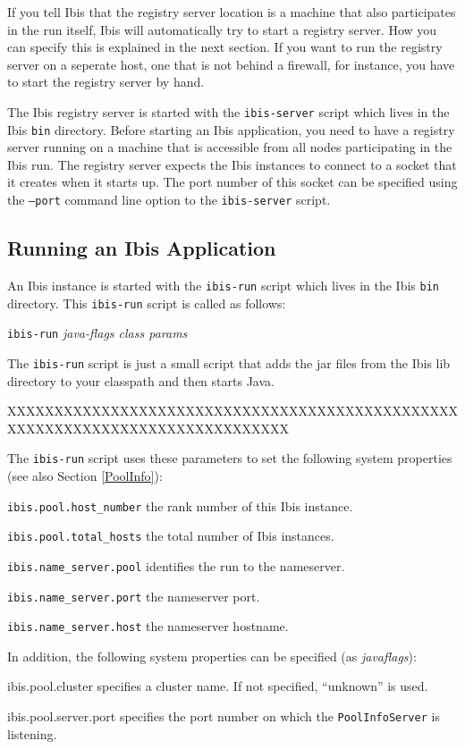 \documentclass[10pt]{article}
\newcommand{\mysubsection}[1]{\subsection{#1}\label{#1}}
\begin{document}
If you tell Ibis that the registry server location is a machine that also
participates in the run itself, Ibis will automatically try to start
a registry server. How you can specify this is explained in the next section.
If you want to run the registry server on a seperate host, one that is not
behind a firewall, for instance, you have to start the registry server by
hand.

The Ibis registry server is started with the \texttt{ibis-server}
script which lives in the Ibis \texttt{bin} directory.
Before starting an Ibis application,
you need to have a registry server running on a machine that is accessible
from all nodes participating in the Ibis run.
The registry server expects the Ibis instances to connect to a
socket that it creates when it starts up.
The port number of this socket can be specified using the
\texttt{--port} command line option to the \texttt{ibis-server} script.

\mysubsection{Running an Ibis Application}

An Ibis instance is started with the \texttt{ibis-run} script which
lives in the Ibis \texttt{bin} directory.  This \texttt{ibis-run}
script is called as follows:
\begin{center}
\texttt{ibis-run} \emph{java-flags class params}
\end{center}
The \texttt{ibis-run} script is just a small script that adds the jar files
from the Ibis lib directory to your classpath and then starts Java.

XXXXXXXXXXXXXXXXXXXXXXXXXXXXXXXXXXXXXXXXXXXXXXXXXXXXXXXXXXXXXXXXXXXXXXXXXXXXXX

The \texttt{ibis-run} script uses these parameters to set the following
system properties (see also Section \ref{PoolInfo}):
\begin{description}
\item{\texttt{ibis.pool.host\_number}}
the rank number of this Ibis instance.
\item{\texttt{ibis.pool.total\_hosts}}
the total number of Ibis instances.
\item{\texttt{ibis.name\_server.pool}}
identifies the run to the nameserver.
\item{\texttt{ibis.name\_server.port}}
the nameserver port.
\item{\texttt{ibis.name\_server.host}}
the nameserver hostname.
\end{description}

In addition, the following system properties can be specified
(as \emph{javaflags}):
\begin{description}
\item{ibis.pool.cluster}
specifies a cluster name. If not specified,
``unknown'' is used.
\item{ibis.pool.server.port}
specifies the port number on which the
\texttt{PoolInfoServer} is listening.
\end{description}
\end{document}
